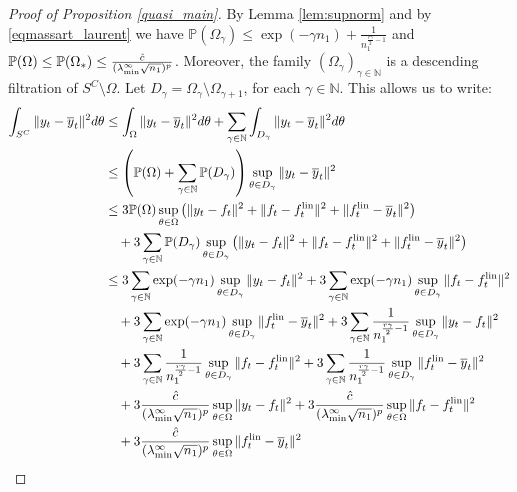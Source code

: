 \documentclass{article}
\theoremstyle{definition}
\theoremstyle{remark}
\numberwithin{equation}{section}
\newcommand{\N}{\mathbb{N}}
\newcommand{\lin}{{\textup{lin}}}
\newcommand{\lammin}{\lambda_{\textup{min}}}
\newcommand{\norm}[2]{
    \|#1\|_{#2}
}
\begin{document}
\begin{proof}[Proof of Proposition \ref{quasi_main}]
    By Lemma \ref{lem:supnorm} and by \eqref{eqmassart_laurent} we have 
    $\mathbb P (\Omega_\gamma) \le \exp(-\gamma n_1) + \frac{1}{n_1^{\frac{r\gamma}{2}-1}}$ and $\mathbb P(\Omega) \le \mathbb P(\Omega_*) \le \frac{\hat c}{(\lammin^\infty\sqrt{n_1})^p}$.
    Moreover, the family $(\Omega_\gamma)_{\gamma \in \N}$ is a descending filtration of $S^C \setminus \Omega$.
    Let $D_\gamma = \Omega_\gamma \setminus \Omega_{\gamma + 1}$, for each $\gamma \in \N$.
    This allows us to write:
    \begin{align}
        \int_{S^C} \norm{y_t-\overline y_t}{}^2 d\theta &\le \int_{\Omega}\norm{y_t-\overline y_t}{}^2 d\theta + \sum_{\gamma \in \N}\int_{D_\gamma} \norm{y_t-\overline y_t}{}^2 d\theta \\
        &\le \left(\mathbb P(\Omega) + \sum_{\gamma \in \N}\mathbb P(D_\gamma)\right) \sup_{\theta \in D_\gamma}\norm{y_t-\overline y_t}{}^2\\
        &\le 3\mathbb P(\Omega)\sup_{\theta \in \Omega}\left(\norm{y_t-f_t}{}^2 + \norm{f_t-f_t^\lin}{}^2+\norm{f^\lin_t-\overline y_t}{}^2\right)  \\
        &\quad + 3\sum_{\gamma \in \N}\mathbb P(D_\gamma)\sup_{\theta \in D_\gamma}\left(\norm{y_t-f_t}{}^2 + \norm{f_t-f_t^\lin}{}^2+\norm{f^\lin_t-\overline y_t}{}^2\right) \\
        \label{eqaux_sum_eventocattivo}&\le 3\sum_{\gamma \in \N}\exp(-\gamma n_1) \sup_{\theta \in D_\gamma}\norm{y_t-f_t}{}^2 + 3\sum_{\gamma \in \N}\exp(-\gamma n_1) \sup_{\theta \in D_\gamma}\norm{f_t-f^\lin_t}{}^2 \\
        &\quad  + 3\sum_{\gamma \in \N}\exp(-\gamma n_1) \sup_{\theta \in D_\gamma}\norm{f^\lin_t-\overline y_t}{}^2 + 3\sum_{\gamma \in \N}\frac{1}{n_1^{\frac{r\gamma}{2}-1}} \sup_{\theta \in D_\gamma}\norm{y_t-f_t}{}^2 \\
        &\quad + 3\sum_{\gamma \in \N}\frac{1}{n_1^{\frac{r\gamma}{2}-1}} \sup_{\theta \in D_\gamma}\norm{f_t-f^\lin_t}{}^2 + 3\sum_{\gamma \in \N}\frac{1}{n_1^{\frac{r\gamma}{2}-1}} \sup_{\theta \in D_\gamma}\norm{f^\lin_t-\overline y_t}{}^2 \\
        &\quad +3\frac{\hat c}{(\lammin^\infty \sqrt{n_1})^p}\sup_{\theta \in \Omega}\norm{y_t-f_t}{}^2 + 3\frac{\hat c}{(\lammin^\infty \sqrt{n_1})^p}\sup_{\theta \in \Omega}\norm{f_t-f^\lin_t}{}^2 \\
        &\quad +3\frac{\hat c}{(\lammin^\infty \sqrt{n_1})^p}\sup_{\theta \in \Omega}\norm{f^\lin_t-\overline y_t}{}^2 
    \end{align}


\end{proof}
\end{document}
